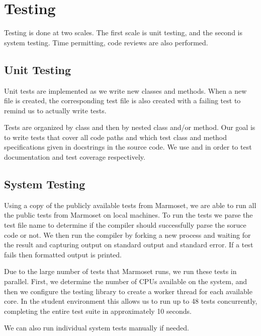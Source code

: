\documentclass[pdftex,11pt,a4paper]{article}
\begin{document}
\section{Testing}

Testing is done at two scales. The first scale is unit testing, and
the second is system testing. Time permitting, code reviews are also
performed.


\subsection{Unit Testing}

Unit tests are implemented as we write new classes and
methods. When a new file is created, the corresponding test file is
also created with a failing test to remind us to actually write tests.

Tests are organized by class and then by nested class and/or
method. Our goal is to write tests that cover all code paths and which
test class and method specifications given in docstrings in the source
code. We use  and  in order to test
documentation and test coverage respectively.


\subsection{System Testing}

Using a copy of the publicly available tests from Marmoset, we are
able to run all the public tests from Marmoset on local machines. To
run the tests we parse the test file name to determine if the compiler
should successfully parse the soruce code or not. We then run the
compiler by forking a new process and waiting for the result and
capturing output on standard output and standard error. If a test
fails then formatted output is printed.

Due to the large number of tests that Marmoset runs, we run these
tests in parallel. First, we determine the number of CPUs available on
the system, and then we configure the testing library to create a
worker thread for each available core. In the student environment this
allows us to run up to 48 tests concurrently, completing the entire
test suite in approximately 10 seconds.

We can also run individual system tests manually if needed.
\end{document}
